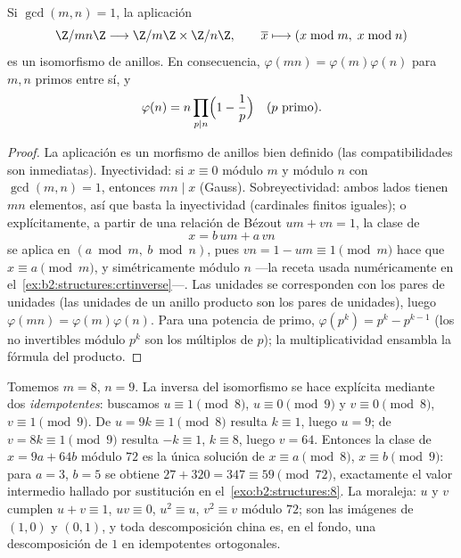 \begin{theorem}\label{thm:b2:structures:crt}
Si $\gcd(m, n) = 1$, la aplicación
\[
\Z/mn\Z \longrightarrow \Z/m\Z \times \Z/n\Z,
\qquad
\overline{x} \longmapsto (x \bmod m,\; x \bmod n)
\]
es un isomorfismo de anillos. En
consecuencia, $\varphi(mn) = \varphi(m)\varphi(n)$ para $m, n$
primos entre sí, y
\[
\varphi(n) = n \prod_{p \mid n} \Bigl(1 - \frac 1p\Bigr)
\quad (p \text{ primo}).
\]
\end{theorem}

\begin{proof}
La aplicación es un morfismo de anillos bien definido (las
compatibilidades son inmediatas). Inyectividad: si $x \equiv 0$
módulo $m$ y módulo $n$ con $\gcd(m,n) = 1$, entonces $mn \mid x$
(Gauss). Sobreyectividad: ambos lados tienen $mn$ elementos, así que
basta la inyectividad (cardinales finitos iguales); o
explícitamente, a partir de una relación de Bézout $um + vn = 1$, la
clase de
\[
x = b\,um + a\,vn
\]
se aplica en $(a \bmod m,\ b \bmod n)$, pues $vn = 1 - um \equiv
1 \pmod m$ hace que $x \equiv a \pmod m$, y simétricamente módulo
$n$ ---la receta usada numéricamente en el~\cref{ex:b2:structures:crtinverse}---. Las unidades se corresponden
con los pares de unidades (las unidades de un anillo producto son
los pares de unidades), luego $\varphi(mn) = \varphi(m)\varphi(n)$.
Para una potencia de primo, $\varphi(p^k) = p^k - p^{k-1}$ (los no
invertibles módulo $p^k$ son los múltiplos de $p$); la
multiplicatividad ensambla la fórmula del producto.
\end{proof}

\begin{example}\label{ex:b2:structures:crtinverse}
Tomemos $m = 8$, $n = 9$. La inversa del isomorfismo se hace
explícita mediante dos \emph{idempotentes}: buscamos $u \equiv 1
\pmod 8$, $u \equiv 0 \pmod 9$ y $v \equiv 0 \pmod 8$, $v \equiv 1
\pmod 9$. De $u = 9k \equiv 1 \pmod 8$ resulta $k \equiv 1$, luego
$u = 9$; de $v = 8k \equiv 1 \pmod 9$ resulta $-k \equiv 1$, $k
\equiv 8$, luego $v = 64$. Entonces la clase de $x = 9a + 64b$
módulo $72$ es la única solución de $x \equiv a \pmod 8$, $x
\equiv b \pmod 9$: para $a = 3$, $b = 5$ se obtiene $27 + 320 =
347 \equiv 59 \pmod{72}$, exactamente el valor intermedio hallado
por sustitución en el~\cref{exo:b2:structures:8}. La moraleja: $u$
y $v$ cumplen $u + v \equiv 1$, $uv \equiv 0$, $u^2 \equiv u$,
$v^2 \equiv v$ módulo $72$; son las imágenes de $(1, 0)$ y $(0,
1)$, y toda descomposición china es, en el fondo, una
descomposición de $1$ en idempotentes ortogonales.
\end{example}

